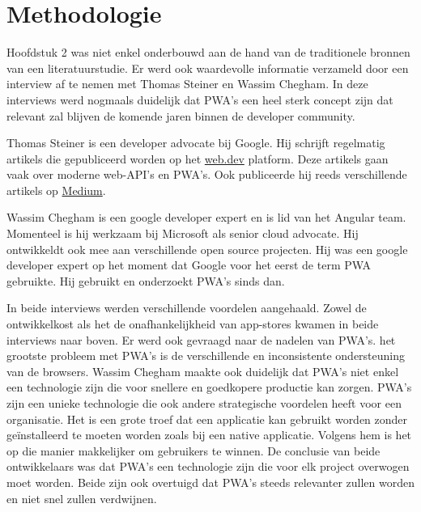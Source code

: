
\chapter{Methodologie}
\label{ch:methodologie}

Hoofdstuk 2 was niet enkel onderbouwd aan de hand van de traditionele bronnen van een literatuurstudie. 
Er werd ook waardevolle informatie verzameld door een interview af te nemen met Thomas Steiner en Wassim Chegham. In deze interviews werd nogmaals duidelijk dat PWA's een heel sterk concept zijn dat relevant zal blijven de komende jaren binnen de developer community.

Thomas Steiner is een developer advocate bij Google. Hij schrijft regelmatig artikels die gepubliceerd worden op het \href{https://web.dev/authors/thomassteiner/}{web.dev} platform. Deze artikels gaan vaak over moderne web-API's en PWA's. Ook publiceerde hij reeds verschillende artikels op \href{https://medium.com/@tomayac}{Medium}.

Wassim Chegham is een google developer expert en is lid van het Angular team. Momenteel is hij werkzaam bij Microsoft als senior cloud advocate. Hij ontwikkeldt ook mee aan verschillende open source projecten. Hij was een google developer expert op het moment dat Google voor het eerst de term PWA gebruikte. Hij gebruikt en onderzoekt PWA's sinds dan.

In beide interviews werden verschillende voordelen aangehaald.  Zowel de ontwikkelkost als het de onafhankelijkheid van app-stores kwamen in beide interviews naar boven. Er werd ook gevraagd naar de nadelen van PWA's. het grootste probleem met PWA's is de verschillende en  inconsistente ondersteuning van de browsers.
Wassim Chegham maakte ook duidelijk dat PWA's niet enkel een technologie zijn die voor snellere en goedkopere productie kan zorgen. PWA's zijn een unieke technologie die ook andere strategische voordelen heeft voor een organisatie. Het is een grote troef dat een applicatie kan gebruikt worden zonder geïnstalleerd te moeten worden zoals bij een native applicatie. Volgens hem is het op die manier makkelijker om gebruikers te winnen.
De conclusie van beide ontwikkelaars was dat PWA's een technologie zijn die voor elk project overwogen moet worden. Beide zijn ook overtuigd dat PWA's steeds relevanter zullen worden en niet snel zullen verdwijnen.

